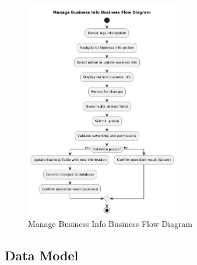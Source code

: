 \documentclass[]{VUMIFTemplateClass}
\begin{document}
\begin{figure}[H]
    \centering
    \includegraphics[width=0.6\textwidth]{images/diagrams/business/bpmn_business_info_manage.png}
    \caption{Manage Business Info Business Flow Diagram}
    \label{fig:business_info_manage_flow}
\end{figure}

\subsection{Data Model}
\end{document}
